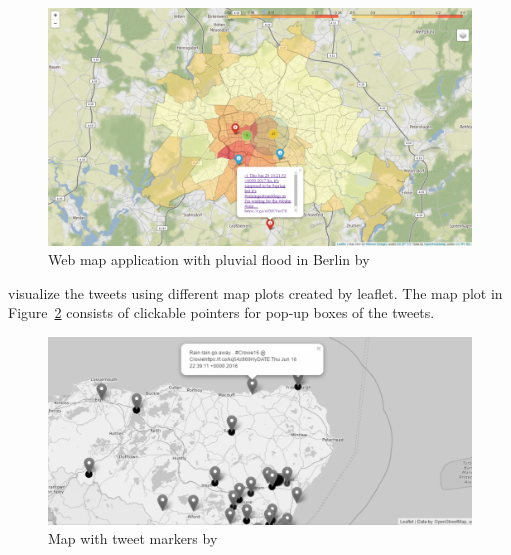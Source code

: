 \begin{figure}[H]
\begin{center}
  \includegraphics[width=13cm]{./images/feng.png}
\end{center}
\caption{Web map application with pluvial flood in Berlin by }
\label{fig:feng}
\end{figure}

 visualize the tweets using different map plots
 created by leaflet. The map plot in Figure~\ref{fig:baker_marker} consists of clickable pointers for pop-up boxes of the tweets.

\begin{figure}[H]
\begin{center}
  \includegraphics[width=13cm]{images/baker_marker.png}
\end{center}
\caption{Map with tweet markers by }
\label{fig:baker_marker}
\end{figure}

